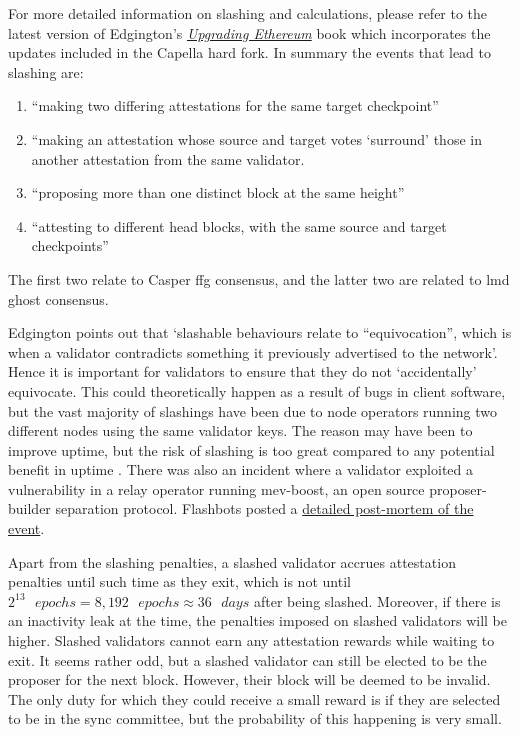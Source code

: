 \documentclass[UTF8]{article}
\begin{document}
{For more detailed information on slashing and calculations, please refer to the latest version of Edgington's  \href{https://eth2book.info/capella/part2/incentives/slashing/}{\textit{Upgrading Ethereum}} book \cite{Edgington2023}  which incorporates the updates included in the Capella hard fork. In summary the events that lead to slashing are:

\begin{enumerate}
\item ``making two differing attestations for the same target checkpoint''
\item ``making an attestation whose source and target votes `surround' those in another attestation from the same validator.
\item ``proposing more than one distinct block at the same height''
\item ``attesting to different head blocks, with the same source and target checkpoints''
\end{enumerate}

The first two relate to Casper \gls{ffg} consensus, and the latter two are related to \gls{lmd} \gls{ghost} consensus.

Edgington points out that `slashable behaviours relate to ``equivocation'', which is when a validator contradicts something it previously advertised to the network'. Hence it is important for validators to ensure that they do not `accidentally' equivocate. This could theoretically happen as a result of bugs in client software, but the vast majority of slashings have been due to node operators running two different nodes using the same validator keys. The reason may have been to improve uptime, but the risk of slashing is too great compared to any potential benefit in uptime \cite{Edgington2023}. There was also an incident where a validator exploited a vulnerability in a relay operator running mev-boost, an open source proposer-builder separation protocol. Flashbots posted a \href{https://collective.flashbots.net/t/post-mortem-april-3rd-2023-mev-boost-relay-incident-and-related-timing-issue/1540}{detailed post-mortem of the event}.

Apart from the slashing penalties, a slashed validator accrues attestation penalties until such time as they exit, which is not until $2^{13} \texttt{ }epochs = 8,192 \texttt{ }epochs \approx 36 \texttt{ } days$ after being slashed. Moreover,  if there is an inactivity leak at the time, the penalties imposed on slashed validators will be higher. Slashed validators cannot earn any attestation rewards while waiting to exit. It seems rather odd, but a slashed validator can still be elected to be the proposer for the next block. However, their block will be deemed to be invalid. The only duty for which they could receive a small reward is if they are selected to be in the sync committee, but the probability of this happening is very small. 

}
\end{document}

